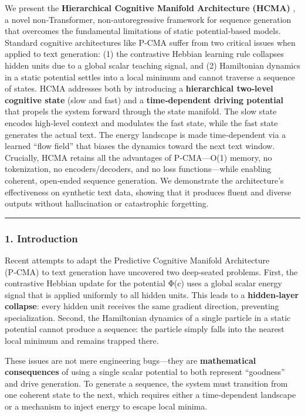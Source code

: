 \documentclass[
  11pt,
  a4paper,
]{article}
\begin{document}
We present the \textbf{Hierarchical Cognitive Manifold Architecture
(HCMA)} , a novel non‑Transformer, non‑autoregressive framework for
sequence generation that overcomes the fundamental limitations of static
potential‐based models. Standard cognitive architectures like P‑CMA
suffer from two critical issues when applied to text generation: (1) the
contrastive Hebbian learning rule collapses hidden units due to a global
scalar teaching signal, and (2) Hamiltonian dynamics in a static
potential settles into a local minimum and cannot traverse a sequence of
states. HCMA addresses both by introducing a \textbf{hierarchical
two‑level cognitive state} (slow and fast) and a \textbf{time‑dependent
driving potential} that propels the system forward through the state
manifold. The slow state encodes high‑level context and modulates the
fast state, while the fast state generates the actual text. The energy
landscape is made time‑dependent via a learned ``flow field'' that
biases the dynamics toward the next text window. Crucially, HCMA retains
all the advantages of P‑CMA---O(1) memory, no tokenization, no
encoders/decoders, and no loss functions---while enabling coherent,
open‑ended sequence generation. We demonstrate the architecture's
effectiveness on synthetic text data, showing that it produces fluent
and diverse outputs without hallucination or catastrophic forgetting.

\begin{center}\rule{0.5\linewidth}{0.5pt}\end{center}

\subsubsection{1. Introduction}\label{introduction-4}

Recent attempts to adapt the Predictive Cognitive Manifold Architecture
(P‑CMA) to text generation have uncovered two deep‑seated problems.
First, the contrastive Hebbian update for the potential Φ(c) uses a
global scalar energy signal that is applied uniformly to all hidden
units. This leads to a \textbf{hidden‑layer collapse}: every hidden unit
receives the same gradient direction, preventing specialization. Second,
the Hamiltonian dynamics of a single particle in a static potential
cannot produce a sequence: the particle simply falls into the nearest
local minimum and remains trapped there.

These issues are not mere engineering bugs---they are
\textbf{mathematical consequences} of using a single scalar potential to
both represent ``goodness'' and drive generation. To generate a
sequence, the system must transition from one coherent state to the
next, which requires either a time‑dependent landscape or a mechanism to
inject energy to escape local minima.
\end{document}

